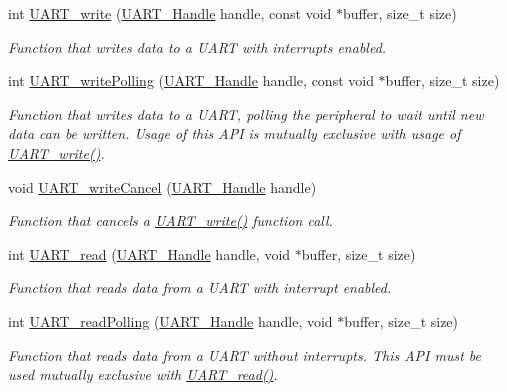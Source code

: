 \begin{DoxyCompactItemize}
int \hyperlink{_u_a_r_t_8h_a6f2a04c09dc17886e69e361cd80aaedc}{U\+A\+R\+T\+\_\+write} (\hyperlink{_u_a_r_t_8h_a13cc669fae768d8212e6491ce71b28af}{U\+A\+R\+T\+\_\+\+Handle} handle, const void $\ast$buffer, size\+\_\+t size)
\begin{DoxyCompactList}\small\item\em Function that writes data to a U\+A\+R\+T with interrupts enabled. \end{DoxyCompactList}\item 
int \hyperlink{_u_a_r_t_8h_aed09b432b5ebb7d88e78ccfe338e1bd4}{U\+A\+R\+T\+\_\+write\+Polling} (\hyperlink{_u_a_r_t_8h_a13cc669fae768d8212e6491ce71b28af}{U\+A\+R\+T\+\_\+\+Handle} handle, const void $\ast$buffer, size\+\_\+t size)
\begin{DoxyCompactList}\small\item\em Function that writes data to a U\+A\+R\+T, polling the peripheral to wait until new data can be written. Usage of this A\+P\+I is mutually exclusive with usage of \hyperlink{_u_a_r_t_8h_a6f2a04c09dc17886e69e361cd80aaedc}{U\+A\+R\+T\+\_\+write()}. \end{DoxyCompactList}\item 
void \hyperlink{_u_a_r_t_8h_a0482cd0ab9ee7e802c8e785a5754d16d}{U\+A\+R\+T\+\_\+write\+Cancel} (\hyperlink{_u_a_r_t_8h_a13cc669fae768d8212e6491ce71b28af}{U\+A\+R\+T\+\_\+\+Handle} handle)
\begin{DoxyCompactList}\small\item\em Function that cancels a \hyperlink{_u_a_r_t_8h_a6f2a04c09dc17886e69e361cd80aaedc}{U\+A\+R\+T\+\_\+write()} function call. \end{DoxyCompactList}\item 
int \hyperlink{_u_a_r_t_8h_a023152d57539cad94bdd813956013e73}{U\+A\+R\+T\+\_\+read} (\hyperlink{_u_a_r_t_8h_a13cc669fae768d8212e6491ce71b28af}{U\+A\+R\+T\+\_\+\+Handle} handle, void $\ast$buffer, size\+\_\+t size)
\begin{DoxyCompactList}\small\item\em Function that reads data from a U\+A\+R\+T with interrupt enabled. \end{DoxyCompactList}\item 
int \hyperlink{_u_a_r_t_8h_aee4c56b20ea1c4c33406d99369db3df1}{U\+A\+R\+T\+\_\+read\+Polling} (\hyperlink{_u_a_r_t_8h_a13cc669fae768d8212e6491ce71b28af}{U\+A\+R\+T\+\_\+\+Handle} handle, void $\ast$buffer, size\+\_\+t size)
\begin{DoxyCompactList}\small\item\em Function that reads data from a U\+A\+R\+T without interrupts. This A\+P\+I must be used mutually exclusive with \hyperlink{_u_a_r_t_8h_a023152d57539cad94bdd813956013e73}{U\+A\+R\+T\+\_\+read()}. \end{DoxyCompactList}\item 

\end{DoxyCompactItemize}
